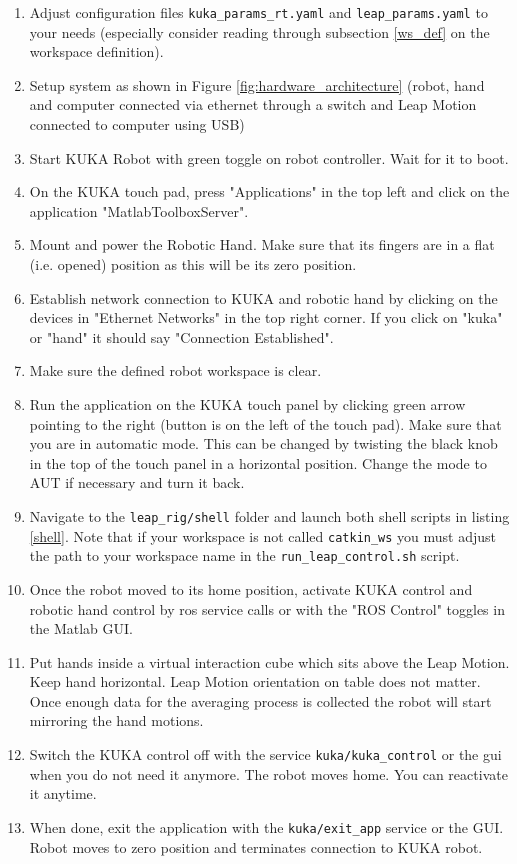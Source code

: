\documentclass[headsepline,footinclude=false,fontsize=11pt,paper=a4,listof=totoc,bibliography=totoc,BCOR=12mm,DIV=14]{scrbook}
\begin{document}
\begin{enumerate}
	\item Adjust configuration files \texttt{kuka\_params\_rt.yaml} and \texttt{leap\_params.yaml} to your needs (especially consider reading through subsection \ref{ws_def} on the workspace definition).
	\item Setup system as shown in Figure \ref{fig:hardware_architecture} (robot, hand and computer connected via ethernet through a switch and Leap Motion connected to computer using USB)
	\item Start KUKA Robot with green toggle on robot controller. Wait for it to boot.
	\item On the KUKA touch pad, press "Applications" in the top left and click on the application "MatlabToolboxServer".
	\item Mount and power the Robotic Hand. Make sure that its fingers are in a flat (i.e. opened) position as this will be its zero position.
	\item Establish network connection to KUKA and robotic hand by clicking on the devices in "Ethernet Networks" in the top right corner. If you click on "kuka" or "hand" it should say "Connection Established".
	\item Make sure the defined robot workspace is clear.
	\item Run the application on the KUKA touch panel by clicking green arrow pointing to the right (button is on the left of the touch pad). Make sure that you are in automatic mode. This can be changed by twisting the black knob in the top of the touch panel in a horizontal position. Change the mode to AUT if necessary and turn it back.
	\item Navigate to the \texttt{leap\_rig/shell} folder and launch both shell scripts in listing \ref{shell}. Note that if your workspace is not called \texttt{catkin\_ws} you must adjust the path to your workspace name in the \texttt{run\_leap\_control.sh} script.
	\item Once the robot moved to its home position, activate KUKA control and robotic hand control by \gls{ros} service calls or with the "ROS Control" toggles in the Matlab GUI.
	\item Put hands inside a virtual interaction cube which sits above the Leap Motion. Keep hand horizontal. Leap Motion orientation on table does not matter. Once enough data for the averaging process is collected the robot will start mirroring the hand motions.
	\item Switch the KUKA control off with the service \texttt{kuka/kuka\_control} or the \gls{gui} when you do not need it anymore. The robot moves home. You can reactivate it anytime. 
	\item When done, exit the application with the \texttt{kuka/exit\_app} service or the GUI. Robot moves to zero position and terminates connection to KUKA robot.
\end{enumerate}
\end{document}
